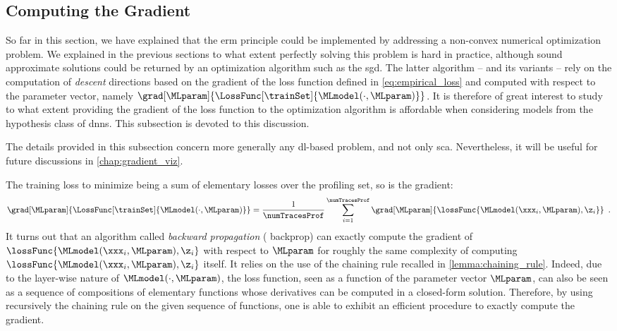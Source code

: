 \subsection{Computing the Gradient}
\label{sec:computing_gradient}
So far in this section, we have explained that the \gls{erm} principle could be implemented by addressing a non-convex numerical optimization problem.
We explained in the previous sections to what extent perfectly solving this problem is hard in practice, although sound approximate solutions could be returned by an optimization algorithm such as the \gls{sgd}.
The latter algorithm -- and its variants -- rely on the computation of \emph{descent} directions based on the gradient of the loss function defined in \autoref{eq:empirical_loss} and computed with respect to the parameter vector, namely \(\grad[\MLparam]{\LossFunc[\trainSet]{\MLmodel(\cdot, \MLparam)}}\).
It is therefore of great interest to study to what extent providing the gradient of the loss function to the optimization algorithm is affordable when considering models from the hypothesis class of \glspl{dnn}.
This subsection is devoted to this discussion.
\begin{remark}
	The details provided in this subsection concern more generally any \gls{dl}-based problem, and not only \gls{sca}.
	Nevertheless, it will be useful for future discussions in \autoref{chap:gradient_viz}.
\end{remark}
The training loss to minimize being a sum of elementary losses over the profiling set, so is the gradient:
\begin{equation}
	\grad[\MLparam]{\LossFunc[\trainSet]{\MLmodel(\cdot, \MLparam)}} = 
	\frac{1}{\numTracesProf} \sum_{i=1}^{\numTracesProf} \grad[\MLparam]{\lossFunc{\MLmodel(\xxx_i, \MLparam), \z_i}} \enspace .
	\label{eq:grad_empirical_loss}
\end{equation}
It turns out that an algorithm called \emph{backward propagation} (\aka{} backprop) can exactly compute the gradient of \(\lossFunc{\MLmodel(\xxx_i, \MLparam), \z_i}\) with respect to \(\MLparam\) for roughly the same complexity of computing \(\lossFunc{\MLmodel(\xxx_i, \MLparam), \z_i}\) itself.
It relies on the use of the chaining rule recalled in \autoref{lemma:chaining_rule}.
Indeed, due to the layer-wise nature of \(\MLmodel(\cdot, \MLparam)\), the loss function, seen as a function of the parameter vector \(\MLparam\), can also be seen as a sequence of compositions of elementary functions whose derivatives can be computed in a closed-form solution.
Therefore, by using recursively the chaining rule on the given sequence of functions, one is able to exhibit an efficient procedure to exactly compute the gradient.

